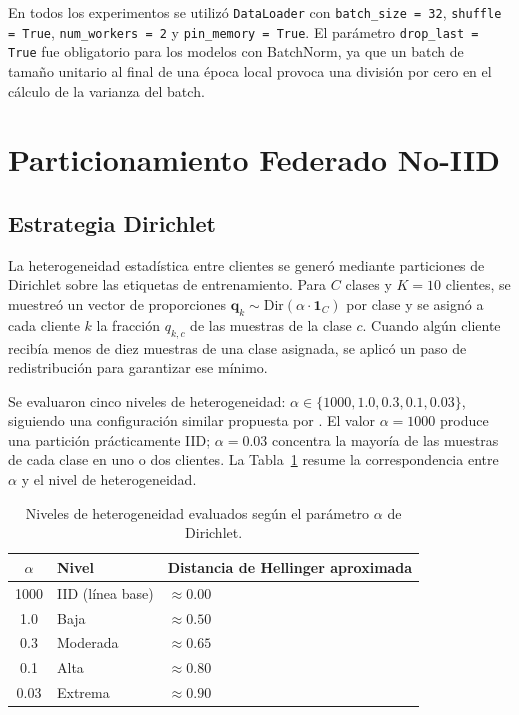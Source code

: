 En todos los experimentos se utilizó \texttt{DataLoader} con \texttt{batch\_size = 32},
\texttt{shuffle = True}, \texttt{num\_workers = 2} y \texttt{pin\_memory = True}. El
parámetro \texttt{drop\_last = True} fue obligatorio para los modelos con BatchNorm, ya que
un batch de tamaño unitario al final de una época local provoca una división por cero en el
cálculo de la varianza del batch.

\section{Particionamiento Federado No-IID}

\subsection{Estrategia Dirichlet}

La heterogeneidad estadística entre clientes se generó mediante particiones de Dirichlet
sobre las etiquetas de entrenamiento. Para $C$ clases y $K = 10$ clientes, se muestreó un
vector de proporciones $\mathbf{q}_k \sim \text{Dir}(\alpha \cdot \mathbf{1}_C)$ por clase y
se asignó a cada cliente $k$ la fracción $q_{k,c}$ de las muestras de la clase $c$. Cuando
algún cliente recibía menos de diez muestras de una clase asignada, se aplicó un paso de
redistribución para garantizar ese mínimo.

Se evaluaron cinco niveles de heterogeneidad: $\alpha \in \{1000, 1.0, 0.3, 0.1, 0.03\}$, 
siguiendo una configuración similar propuesta por \cite{jimenez2503thorough}.
El valor $\alpha = 1000$ produce una partición prácticamente IID; $\alpha = 0.03$ concentra
la mayoría de las muestras de cada clase en uno o dos clientes. La Tabla~\ref{tab:alpha_levels}
resume la correspondencia entre $\alpha$ y el nivel de heterogeneidad.

\begin{table}[H]
\centering
\caption{Niveles de heterogeneidad evaluados según el parámetro $\alpha$ de Dirichlet.}
\label{tab:alpha_levels}
\begin{tabular}{cll}
\hline
$\alpha$ & Nivel & Distancia de Hellinger aproximada \\
\hline
1000  & IID (línea base) & $\approx 0.00$ \\
1.0   & Baja             & $\approx 0.50$ \\
0.3   & Moderada         & $\approx 0.65$ \\
0.1   & Alta             & $\approx 0.80$ \\
0.03  & Extrema          & $\approx 0.90$ \\
\hline
\end{tabular}
\end{table}


